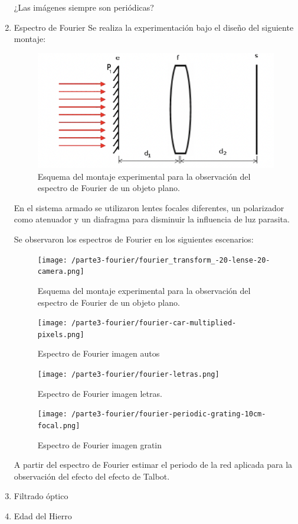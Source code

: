 \documentclass{./packages/optica-article}
\begin{document}
\begin{enumerate}
¿Las imágenes siempre son periódicas?



    \item Espectro de Fourier
Se realiza la experimentación bajo el diseño del siguiente montaje:

\begin{figure}[h]
    \centering
    \includegraphics[scale=1]{sistemaespectrodefourier.png}
    \caption{Esquema del montaje experimental para la observación del espectro de Fourier de un objeto plano. }
    \label{fouriersistema}
    \end{figure}

En el sistema armado se utilizaron lentes focales diferentes, un polarizador como atenuador y un diafragma para disminuir la influencia de luz parasita.

Se observaron los espectros de Fourier en los siguientes escenarios: \par


\begin{figure}[h]
    \centering
    \texttt{[image: /parte3-fourier/fourier\_transform\_-20-lense-20-camera.png]}
    \caption{Esquema del montaje experimental para la observación del espectro de Fourier de un objeto plano. }
    \label{fourier1}
    \end{figure}

\begin{figure}[h]
    \centering
    \texttt{[image: /parte3-fourier/fourier-car-multiplied-pixels.png]}
    \caption{Espectro de Fourier imagen autos }
    \label{fourier2}
    \end{figure}
    
    \begin{figure}[h]
    \centering
    \texttt{[image: /parte3-fourier/fourier-letras.png]}
    \caption{Espectro de Fourier imagen letras. }
    \label{fourier3}
    \end{figure}
    
    \begin{figure}[h]
    \centering
    \texttt{[image: /parte3-fourier/fourier-periodic-grating-10cm-focal.png]}
    \caption{Espectro de Fourier imagen gratin }
    \label{fourier4}
    \end{figure}
    
A partir del espectro de Fourier estimar el periodo de la red aplicada para la observación del efecto del efecto de Talbot.


    \item Filtrado óptico
    \item Edad del Hierro
\end{enumerate}
\end{document}
